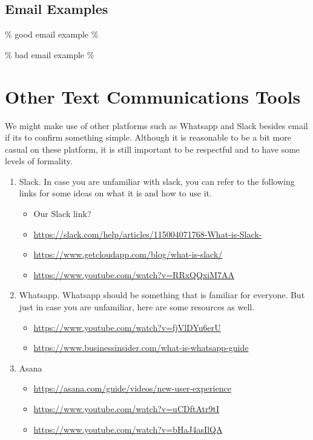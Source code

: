 \documentclass[
]{book}
\begin{document}
\hypertarget{email-examples}{%
\subsection{Email Examples}\label{email-examples}}

\% good email example \%

\% bad email example \%

\hypertarget{other-text-communications-tools}{%
\section{Other Text Communications Tools}\label{other-text-communications-tools}}

We might make use of other platforms such as Whatsapp and Slack besides email if its to confirm something simple. Although it is reasonable to be a bit more casual on these platform, it is still important to be respectful and to have some levels of formality.

\begin{enumerate}
\def\labelenumi{\arabic{enumi}.}
\item
  Slack. In case you are unfamiliar with slack, you can refer to the following links for some ideas on what it is and how to use it.

  \begin{itemize}
  \item
    Our Slack link?
  \item
    \url{https://slack.com/help/articles/115004071768-What-is-Slack-}
  \item
    \url{https://www.getcloudapp.com/blog/what-is-slack/}
  \item
    \url{https://www.youtube.com/watch?v=RRxQQxiM7AA}
  \end{itemize}
\item
  Whatsapp. Whatsapp should be something that is familiar for everyone. But just in case you are unfamiliar, here are some resources as well.

  \begin{itemize}
  \item
    \url{https://www.youtube.com/watch?v=fjVlDYu6erU}
  \item
    \url{https://www.businessinsider.com/what-is-whatsapp-guide}
  \end{itemize}
\item
  Asana

  \begin{itemize}
  \item
    \url{https://asana.com/guide/videos/new-user-experience}
  \item
    \url{https://www.youtube.com/watch?v=uCDftAtr9tI}
  \item
    \url{https://www.youtube.com/watch?v=bHaJ4asIlQA}
  \end{itemize}
\end{enumerate}
\end{document}
